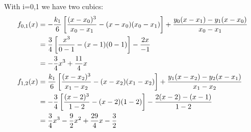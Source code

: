 \begin{exercise}{4}
With i=0,1 we have two cubics:
\begin{align}
\notag
f_{0,1}(x) &= - \frac{k_1}{6}\left[\frac{(x-x_0)^3}{x_0-x_1}-(x-x_0)(x_0-x_1)\right]
+ \frac{y_0(x-x_1)-y_1(x-x_0)}{x_0-x_1}\\
\notag
&=\frac{3}{4}\left[\frac{x^3}{0-1} - (x-1)(0-1)\right] - \frac{2x}{-1}\\
\notag
&= -\frac{3}{4}x^3 + \frac{11}{4}x\\ 
\notag
f_{1,2}(x) &=\frac{k_1}{6}\left[\frac{(x-x_2)^3}{x_1-x_2}-(x-x_2)(x_1-x_2)\right]
+\frac{y_1(x-x_2)-y_2(x-x_1)}{x_1-x_2}\\
\notag
&=-\frac{3}{4}\left[\frac{(x-2)^3}{1-2} - (x-2)(1-2)\right] - \frac{2(x-2)-(x-1)}{1-2}\\
\notag
&=\frac{3}{4}x^3-\frac{9}{2}x^2+\frac{29}{4}x-\frac{3}{2}
\end{align}
\end{exercise}


 
